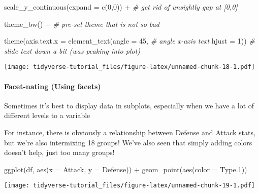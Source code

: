 \documentclass[
]{article}
\newenvironment{Shaded}{\begin{snugshade}}{\end{snugshade}}
\newcommand{\AttributeTok}[1]{\textcolor[rgb]{0.77,0.63,0.00}{#1}}
\newcommand{\CommentTok}[1]{\textcolor[rgb]{0.56,0.35,0.01}{\textit{#1}}}
\newcommand{\DecValTok}[1]{\textcolor[rgb]{0.00,0.00,0.81}{#1}}
\newcommand{\FloatTok}[1]{\textcolor[rgb]{0.00,0.00,0.81}{#1}}
\newcommand{\FunctionTok}[1]{\textcolor[rgb]{0.00,0.00,0.00}{#1}}
\newcommand{\NormalTok}[1]{#1}
\newcommand{\SpecialCharTok}[1]{\textcolor[rgb]{0.00,0.00,0.00}{#1}}
\begin{document}
\begin{Shaded}
\begin{Highlighting}[]
  \FunctionTok{scale\_y\_continuous}\NormalTok{(}\AttributeTok{expand =} \FunctionTok{c}\NormalTok{(}\DecValTok{0}\NormalTok{,}\DecValTok{0}\NormalTok{)) }\SpecialCharTok{+}         \CommentTok{\# get rid of unsightly gap at [0,0]}
  
  \FunctionTok{theme\_bw}\NormalTok{() }\SpecialCharTok{+}                                  \CommentTok{\# pre{-}set theme that is not so bad}
  
  \FunctionTok{theme}\NormalTok{(}\AttributeTok{axis.text.x =} \FunctionTok{element\_text}\NormalTok{(}\AttributeTok{angle =} \DecValTok{45}\NormalTok{,  }\CommentTok{\# angle x{-}axis text}
                                   \AttributeTok{hjust =} \DecValTok{1}\NormalTok{))  }\CommentTok{\# slide text down a bit (was peaking into plot)}
\end{Highlighting}
\end{Shaded}

\texttt{[image: tidyverse-tutorial\_files/figure-latex/unnamed-chunk-18-1.pdf]}

\hypertarget{facet-nating-using-facets}{%
\paragraph{Facet-nating (Using
facets)}\label{facet-nating-using-facets}}

Sometimes it's best to display data in subplots, especially when we have
a lot of different levels to a variable

For instance, there is obviously a relationship between Defense and
Attack stats, but we're also intermixing 18 groups! We've also seen that
simply adding colors doesn't help, just too many groups!

\begin{Shaded}
\begin{Highlighting}[]
\FunctionTok{ggplot}\NormalTok{(df, }\FunctionTok{aes}\NormalTok{(}\AttributeTok{x =}\NormalTok{ Attack, }\AttributeTok{y =}\NormalTok{ Defense)) }\SpecialCharTok{+}
  \FunctionTok{geom\_point}\NormalTok{(}\FunctionTok{aes}\NormalTok{(}\AttributeTok{color =}\NormalTok{ Type}\FloatTok{.1}\NormalTok{))}
\end{Highlighting}
\end{Shaded}

\texttt{[image: tidyverse-tutorial\_files/figure-latex/unnamed-chunk-19-1.pdf]}
\end{document}
